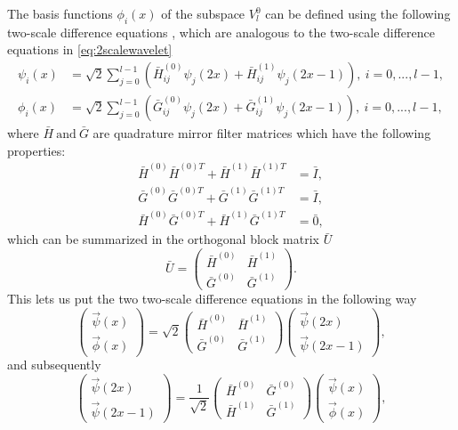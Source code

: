 \documentclass[../master_thesis.tex]{subfiles}
\begin{document}
 The basis functions $\phi_i(x)$ of the subspace $V_l^0$ can be defined using the following two-scale
difference equations \cite{Beylkin1999AdaptiveSO}, which are analogous to the
two-scale difference equations in \ref{eq:2scalewavelet}
\begin{align}
  \psi_i(x) &= \sqrt{2}\sum^{l-1}_{j=0}\left(\bar{H}^{(0)}_{ij}\psi_j(2x) + \bar{H}^{(1)}_{ij}\psi_j(2x-1)\right), \ i = 0,...,l-1, \\
  \phi_i(x) &= \sqrt{2}\sum^{l-1}_{j=0}\left(\bar{G}^{(0)}_{ij}\psi_j(2x) + \bar{G}^{(1)}_{ij}\psi_j(2x-1)\right), \ i = 0,...,l-1,
\end{align}
where $ \bar{H} \ \text{and}\ \bar{G} $ are quadrature mirror filter matrices \cite{Beylkin1999AdaptiveSO} which have
the following properties:
\begin{align}
  \bar{H}^{(0)}\bar{H}^{(0)T} + \bar{H}^{(1)}\bar{H}^{(1)T} &= \bar{I}, \\
  \bar{G}^{(0)}\bar{G}^{(0)T} + \bar{G}^{(1)}\bar{G}^{(1)T} &= \bar{I}, \\
  \bar{H}^{(0)}\bar{G}^{(0)T} + \bar{H}^{(1)}\bar{G}^{(1)T} &= \bar{0},
\end{align}
which can be summarized in the orthogonal block matrix $\bar{U}$ \cite{Beylkin1999AdaptiveSO}
\begin{equation}
  \bar{U} =
  \begin{pmatrix}
    \bar{H}^{(0)} & \bar{H}^{(1)} \\
    \bar{G}^{(0)} & \bar{G}^{(1)}
  \end{pmatrix}.
\end{equation}
This lets us put the two two-scale difference equations in the following way \cite{Sorland}
\begin{equation}
  \begin{pmatrix}
    \vec{\psi}(x) \\
    \vec{\phi}(x)
  \end{pmatrix}
  = \sqrt{2}
  \begin{pmatrix}
    \bar{H}^{(0)} & \bar{H}^{(1)} \\
    \bar{G}^{(0)} & \bar{G}^{(1)}
  \end{pmatrix}
  \begin{pmatrix}
    \vec{\psi}(2x) \\
    \vec{\psi}(2x-1)
  \end{pmatrix},
\end{equation}
and subsequently
\begin{equation}
  \begin{pmatrix}
    \vec{\psi}(2x) \\
    \vec{\psi}(2x-1)
  \end{pmatrix}
  = \frac{1}{\sqrt{2}}
  \begin{pmatrix}
    \bar{H}^{(0)} & \bar{G}^{(0)} \\
    \bar{H}^{(1)} & \bar{G}^{(1)}
  \end{pmatrix}
  \begin{pmatrix}
    \vec{\psi}(x) \\
    \vec{\phi}(x)
  \end{pmatrix},
\end{equation}
\end{document}
